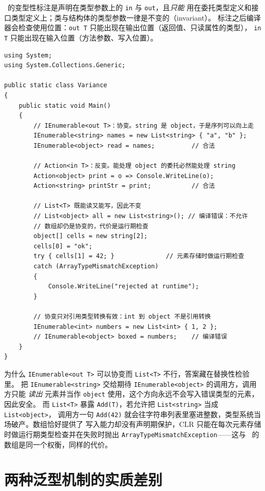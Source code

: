 \documentclass[12pt,a4paper,fontset=fandol]{ctexbook}
\newcommand{\javalabel}{%
  \tcbox[on line,colback=javaheadbg,colframe=javaheadbg,
    boxrule=0pt,arc=1pt,left=2pt,right=2pt,top=1pt,bottom=1pt,
    colupper=white,fontupper=\scriptsize\bfseries]{Java}}
\newcommand{\csharplabel}{%
  \tcbox[on line,colback=csharpheadbg,colframe=csharpheadbg,
    boxrule=0pt,arc=1pt,left=2pt,right=2pt,top=1pt,bottom=1pt,
    colupper=white,fontupper=\scriptsize\bfseries]{C\#}}
\newcommand{\kw}[1]{\texttt{#1}}
\begin{document}
\csharplabel\ 的变型性标注是声明在类型参数上的 \kw{in} 与 \kw{out}，且\emph{只能}
用在委托类型定义和接口类型定义上；类与结构体的类型参数一律是不变的（invariant）。
标注之后编译器会检查使用位置：\kw{out T} 只能出现在输出位置（返回值、只读属性的类型），
\kw{in T} 只能出现在输入位置（方法参数、写入位置）。

\begin{lstlisting}[style=csharpstyle,caption={协变与反变：谁可以安全地转换，谁必须保持不变}]
using System;
using System.Collections.Generic;

public static class Variance
{
    public static void Main()
    {
        // IEnumerable<out T>：协变。string 是 object，于是序列可以向上走
        IEnumerable<string> names = new List<string> { "a", "b" };
        IEnumerable<object> read = names;          // 合法

        // Action<in T>：反变。能处理 object 的委托必然能处理 string
        Action<object> print = o => Console.WriteLine(o);
        Action<string> printStr = print;           // 合法

        // List<T> 既能读又能写，因此不变
        // List<object> all = new List<string>(); // 编译错误：不允许
        // 数组却仍是协变的，代价是运行期检查
        object[] cells = new string[2];
        cells[0] = "ok";
        try { cells[1] = 42; }              // 元素存储时做运行期检查
        catch (ArrayTypeMismatchException)
        {
            Console.WriteLine("rejected at runtime");
        }

        // 协变只对引用类型转换有效：int 到 object 不是引用转换
        IEnumerable<int> numbers = new List<int> { 1, 2 };
        // IEnumerable<object> boxed = numbers;    // 编译错误
    }
}
\end{lstlisting}

为什么 \kw{IEnumerable<out T>} 可以协变而 \kw{List<T>} 不行，答案藏在替换性检验里。
把 \kw{IEnumerable<string>} 交给期待 \kw{IEnumerable<object>} 的调用方，调用方只能
\emph{读出} 元素并当作 \kw{object} 使用，这个方向永远不会写入错误类型的元素，因此安全。
而 \kw{List<T>} 暴露 \kw{Add(T)}，若允许把 \kw{List<string>} 当成 \kw{List<object>}，
调用方一句 \kw{Add(42)} 就会往字符串列表里塞进整数，类型系统当场破产。数组恰好提供了
写入能力却没有声明期保护，CLR 只能在每次元素存储时做运行期类型检查并在失败时抛出
\kw{ArrayTypeMismatchException}——这与 \javalabel\ 的数组是同一个权衡，同样的代价。

\section{两种泛型机制的实质差别}
\end{document}
